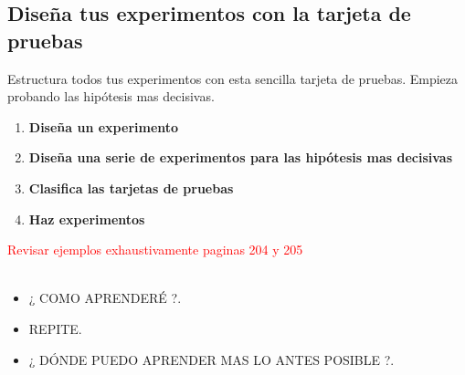 \documentclass[11pt]{book}
\begin{document}
\subsection{Diseña tus experimentos con la tarjeta de pruebas}
Estructura todos tus experimentos con esta sencilla tarjeta de pruebas. Empieza probando las hipótesis mas decisivas.
\begin{enumerate}
\item \textbf{ Diseña un experimento }\\

\item \textbf{ Diseña una serie de experimentos para las hipótesis mas decisivas }\\

\item \textbf{ Clasifica las tarjetas de pruebas }\\

\item \textbf{ Haz experimentos }\\

\end{enumerate}
\textcolor{red}{Revisar ejemplos exhaustivamente paginas 204 y 205}\\\\
\begin{itemize}
\item ¿ COMO APRENDERÉ ?.
\item REPITE.
\item ¿ DÓNDE PUEDO APRENDER MAS LO ANTES POSIBLE ?.
\end{itemize}
\end{document}
